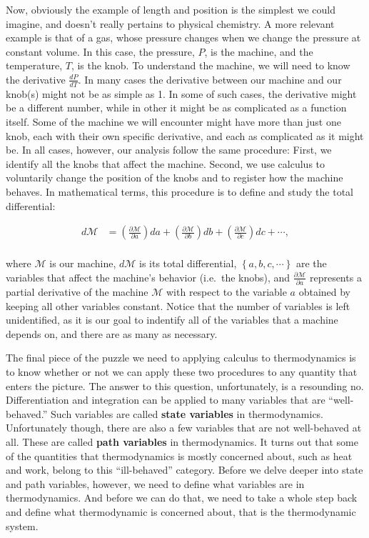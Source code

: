 \documentclass[
  9pt,
]{extbook}
\theoremstyle{definition}
\theoremstyle{definition}
\theoremstyle{definition}
\theoremstyle{definition}
\theoremstyle{remark}
\begin{document}
Now, obviously the example of length and position is the simplest we could imagine, and doesn't really pertains to physical chemistry. A more relevant example is that of a gas, whose pressure changes when we change the pressure at constant volume. In this case, the pressure, \(P\), is the machine, and the temperature, \(T\), is the knob. To understand the machine, we will need to know the derivative \(\frac{dP}{dT}\). In many cases the derivative between our machine and our knob(s) might not be as simple as 1. In some of such cases, the derivative might be a different number, while in other it might be as complicated as a function itself. Some of the machine we will encounter might have more than just one knob, each with their own specific derivative, and each as complicated as it might be. In all cases, however, our analysis follow the same procedure: First, we identify all the knobs that affect the machine. Second, we use calculus to voluntarily change the position of the knobs and to register how the machine behaves. In mathematical terms, this procedure is to define and study the total differential:

\begin{equation}
\begin{aligned}
d\mathcal{M} &= \left( \frac{\partial \mathcal{M}}{\partial a} \right) da + \left( \frac{\partial \mathcal{M}}{\partial b} \right) db + \left( \frac{\partial \mathcal{M}}{\partial c} \right) dc + \cdots ,\\
\end{aligned}
\label{eq:totdiff}
\end{equation}

where \(\mathcal{M}\) is our machine, \(d\mathcal{M}\) is its total differential, \(\left\{a,b,c,\cdots\right\}\) are the variables that affect the machine's behavior (i.e.~the knobs), and \(\frac{\partial \mathcal{M}}{\partial a}\) represents a partial derivative of the machine \(\mathcal{M}\) with respect to the variable \(a\) obtained by keeping all other variables constant. Notice that the number of variables is left unidentified, as it is our goal to indentify all of the variables that a machine depends on, and there are as many as necessary.

The final piece of the puzzle we need to applying calculus to thermodynamics is to know whether or not we can apply these two procedures to any quantity that enters the picture. The answer to this question, unfortunately, is a resounding no. Differentiation and integration can be applied to many variables that are ``well-behaved.'' Such variables are called \textbf{state variables} in thermodynamics. Unfortunately though, there are also a few variables that are not well-behaved at all. These are called \textbf{path variables} in thermodynamics. It turns out that some of the quantities that thermodynamics is mostly concerned about, such as heat and work, belong to this ``ill-behaved'' category. Before we delve deeper into state and path variables, however, we need to define what variables are in thermodynamics. And before we can do that, we need to take a whole step back and define what thermodynamic is concerned about, that is the thermodynamic system.
\end{document}
